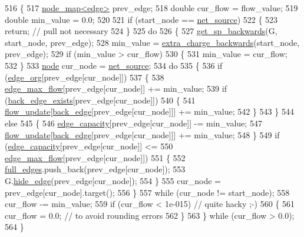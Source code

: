 \begin{DoxyCode}
516 \{
517     \mbox{\hyperlink{classnode__map}{node\_map<edge>}} prev\_edge;
518     \textcolor{keywordtype}{double} cur\_flow = flow\_value;
519     \textcolor{keywordtype}{double} min\_value = 0.0;
520     
521     \textcolor{keywordflow}{if} (start\_node == \mbox{\hyperlink{classmaxflow__pp_a20f2d05465acc2d7b777ea8025d12003}{net\_source}})
522     \{
523     \textcolor{keywordflow}{return}; \textcolor{comment}{// pull not necessary}
524     \}
525     \textcolor{keywordflow}{do}
526     \{
527     \mbox{\hyperlink{classmaxflow__pp_a58b7af1b215766e99adcca0994ecfb7a}{get\_sp\_backwards}}(G, start\_node, prev\_edge);
528     min\_value = \mbox{\hyperlink{classmaxflow__pp_a9d9651e53139201506b22eed1ecbdd51}{extra\_charge\_backwards}}(start\_node, prev\_edge);
529     \textcolor{keywordflow}{if} (min\_value > cur\_flow)
530     \{
531         min\_value = cur\_flow;
532     \}
533     \mbox{\hyperlink{classnode}{node}} cur\_node = \mbox{\hyperlink{classmaxflow__pp_a20f2d05465acc2d7b777ea8025d12003}{net\_source}};
534     \textcolor{keywordflow}{do}
535     \{
536         \textcolor{keywordflow}{if} (\mbox{\hyperlink{classmaxflow__pp_aca9ce457300e11b97cec3446315fda1c}{edge\_org}}[prev\_edge[cur\_node]])
537         \{
538         \mbox{\hyperlink{classmaxflow__pp_a25d5bb2ab6c775a634dacf408ff55a83}{edge\_max\_flow}}[prev\_edge[cur\_node]] += min\_value;
539         \textcolor{keywordflow}{if} (\mbox{\hyperlink{classmaxflow__pp_a50e9c82f1e720b8340ea4dc6d438f110}{back\_edge\_exists}}[prev\_edge[cur\_node]])
540         \{
541             \mbox{\hyperlink{classmaxflow__pp_ad37aff831935b2cfd4b03bc4a6da06ce}{flow\_update}}[\mbox{\hyperlink{classmaxflow__pp_a9fdef5a86459eaf9634737094f3de250}{back\_edge}}[prev\_edge[cur\_node]]] += min\_value;
542         \}
543         \}
544         \textcolor{keywordflow}{else}
545         \{
546         \mbox{\hyperlink{classmaxflow__pp_af3cdc4999a86322271a80b1855d58629}{edge\_capacity}}[prev\_edge[cur\_node]] -= min\_value;
547         \mbox{\hyperlink{classmaxflow__pp_ad37aff831935b2cfd4b03bc4a6da06ce}{flow\_update}}[\mbox{\hyperlink{classmaxflow__pp_a9fdef5a86459eaf9634737094f3de250}{back\_edge}}[prev\_edge[cur\_node]]] += min\_value;
548         \}
549         \textcolor{keywordflow}{if} (\mbox{\hyperlink{classmaxflow__pp_af3cdc4999a86322271a80b1855d58629}{edge\_capacity}}[prev\_edge[cur\_node]] <= 
550         \mbox{\hyperlink{classmaxflow__pp_a25d5bb2ab6c775a634dacf408ff55a83}{edge\_max\_flow}}[prev\_edge[cur\_node]])
551         \{
552         \mbox{\hyperlink{classmaxflow__pp_a504adabbe1e7b11a910d6c43a6b71a75}{full\_edges}}.push\_back(prev\_edge[cur\_node]);
553         G.\mbox{\hyperlink{classgraph_ab2f8520bcac080d73c55228fecc61825}{hide\_edge}}(prev\_edge[cur\_node]);
554         \}
555         cur\_node = prev\_edge[cur\_node].target();
556     \}
557     \textcolor{keywordflow}{while} (cur\_node != start\_node);
558     cur\_flow -= min\_value;
559     \textcolor{keywordflow}{if} (cur\_flow < 1e-015)  \textcolor{comment}{// quite hacky ;-)}
560     \{
561         cur\_flow = 0.0; \textcolor{comment}{// to avoid rounding errors}
562     \}
563     \} \textcolor{keywordflow}{while} (cur\_flow > 0.0);
564 \}
\end{DoxyCode}
